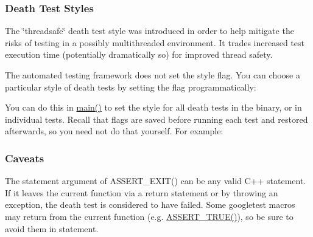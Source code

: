 \subsubsection*{Death Test Styles}

The \char`\"{}threadsafe\char`\"{} death test style was introduced in order to help mitigate the risks of testing in a possibly multithreaded environment. It trades increased test execution time (potentially dramatically so) for improved thread safety.

The automated testing framework does not set the style flag. You can choose a particular style of death tests by setting the flag programmatically\+:


\begin{DoxyCode}{0}
\end{DoxyCode}


You can do this in {\ttfamily \mbox{\hyperlink{_be_01vektoriaus_2main_8cpp_ae66f6b31b5ad750f1fe042a706a4e3d4}{main()}}} to set the style for all death tests in the binary, or in individual tests. Recall that flags are saved before running each test and restored afterwards, so you need not do that yourself. For example\+:


\begin{DoxyCode}{0}
\DoxyCodeLine{\}}
\DoxyCodeLine{}
\DoxyCodeLine{\}}
\DoxyCodeLine{}
\DoxyCodeLine{\}}
\end{DoxyCode}


\subsubsection*{Caveats}

The {\ttfamily statement} argument of {\ttfamily A\+S\+S\+E\+R\+T\+\_\+\+E\+X\+I\+T()} can be any valid C++ statement. If it leaves the current function via a {\ttfamily return} statement or by throwing an exception, the death test is considered to have failed. Some googletest macros may return from the current function (e.\+g. {\ttfamily \mbox{\hyperlink{googletest-master_2googletest_2include_2gtest_2gtest_8h_ae9244bfbda562e8b798789b001993fa5}{A\+S\+S\+E\+R\+T\+\_\+\+T\+R\+U\+E()}}}), so be sure to avoid them in {\ttfamily statement}.

